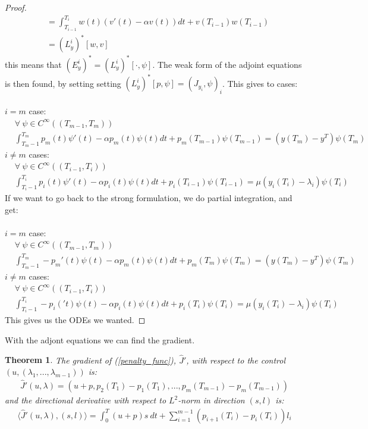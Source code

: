 \documentclass[11pt,a4paper]{article}
\newtheorem{theorem}{Theorem}
\begin{document}
\begin{proof}
\begin{align*}
&=\int_{T_{i-1}}^{T_i}w(t)(v'(t)-\alpha v(t))dt + v(T_{i-1})w(T_{i-1}) \\
&=(L_y^i)^*[w,v]
\end{align*}
this means that $(E_y^i)^*=(L_y^i)^*[\cdot,\psi]$. The weak form of the adjoint equations is then found, by setting setting $(L_y^i)^*[p,\psi]=(J_{y_i},\psi)_i$. This gives to cases:
\\
\\
$i=m$ case:
\begin{align*}
&\forall \ \psi \in C^{\infty}((T_{m-1},T_m)) \\
&\int_{T_m-1}^{T_m}p_m(t)\psi'(t)-\alpha p_m(t)\psi(t)dt +p_m(T_{m-1})\psi(T_{m-1})
= (y(T_m)-y^T)\psi(T_m)\ 
\end{align*}
$i\neq m$ cases:
\begin{align*}
&\forall \ \psi \in C^{\infty}((T_{i-1},T_i))\\
&\int_{T_i-1}^{T_i}p_i(t)\psi'(t)-\alpha p_i(t)\psi(t)dt +p_i(T_{i-1})\psi(T_{i-1})
= \mu(y_{i}(T_i)-\lambda_i )\psi(T_i) \ 
\end{align*}
If we want to go back to the strong formulation, we do partial integration, and get:
\\
\\
 $i=m$ case:
\begin{align*}
&\forall \ \psi \in C^{\infty}((T_{m-1},T_m)) \\
&\int_{T_m-1}^{T_m}-p_m'(t)\psi(t)-\alpha p_m(t)\psi(t)dt +p_m(T_{m})\psi(T_{m})
= (y(T_m)-y^T)\psi(T_m)\ 
\end{align*}
$i\neq m$ cases:
\begin{align*}
&\forall \ \psi \in C^{\infty}((T_{i-1},T_i))\\
&\int_{T_i-1}^{T_i}-p_i('t)\psi(t)-\alpha p_i(t)\psi(t)dt +p_i(T_{i})\psi(T_{i})
= \mu(y_{i}(T_i)-\lambda_i )\psi(T_i) \ 
\end{align*}
This gives us the ODEs we wanted.
\end{proof}
With the adjont equations we can find the gradient.
\begin{theorem}
The gradient of (\ref{penalty_func}), $\hat{J}'$, with respect to the control $(u,(\lambda_1,...,\lambda_{m-1}))$ is:
\begin{align*}
\hat{J}'(u,\lambda) = (u+p,p_{2}(T_1) -p_{1}(T_1),..., p_{m}(T_{m-1}) -p_{m}(T_{m-1}))
\end{align*} 
and the directional derivative with respect to $L^2$-norm in direction $(s,l)$ is:
\begin{align*}
\langle \hat{J}'(u,\lambda), (s,l)\rangle = \int_0^T (u+p)s \ dt +\sum_{i=1}^{m-1}(p_{i+1}(T_i) -p_{i}(T_i) )l_i
\end{align*}
\end{theorem}
\end{document}
